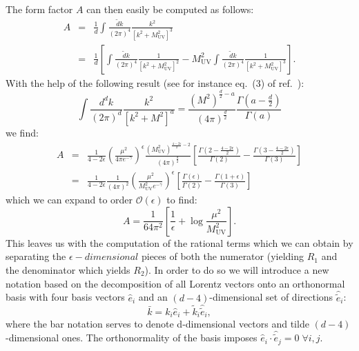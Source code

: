 \documentclass[11pt]{article}
\begin{document}
The form factor $A$ can then easily be computed as follows:
\begin{eqnarray}
A&=&\frac{1}{d} \int \frac{\tilde{d} k}{(2\pi)^4} \frac{ k^2 }{\left[ k^2+M_\textrm{UV}^2\right]^3} \nonumber\\
&=&\frac{1}{d} \left [ 
\int\frac{\tilde{d} k}{(2\pi)^4} \frac{ 1 }{\left[ k^2+M_\textrm{UV}^2\right]^2} 
-M_\textrm{UV}^2 \int \frac{\tilde{d} k}{(2\pi)^4} \frac{ 1 }{\left[ k^2+M_\textrm{UV}^2\right]^3} 
\right ].
\end{eqnarray}
With the help of the following result (see for instance eq.~(3) of ref.~\cite{Steinhauser:2000ry}):
\begin{equation}
\int \frac{d^d k}{(2\pi)^d} \frac{ k^2 }{\left[ k^2+M^2\right]^a} =\frac{(M^2)^{\frac{d}{2}-a}}{(4\pi)^\frac{d}{2}}\frac{\Gamma(a-\frac{d}{2})}{\Gamma(a)}
\end{equation}
we find:
\begin{eqnarray}
A&=&\frac{1}{4-2\epsilon}\left(\frac{\mu^2}{4\pi e^{-\gamma}}\right)^{\epsilon} \frac{(M_\textrm{UV}^2)^{\frac{4-2\epsilon}{2}-2}}{(4\pi)^\frac{d}{2}} \left [ 
\frac{\Gamma(2-\frac{4-2\epsilon}{2})}{\Gamma(2)} - \frac{\Gamma(3-\frac{4-2\epsilon}{2})}{\Gamma(3)}
\right] \nonumber \\
&=&\frac{1}{4-2\epsilon} \frac{1}{(4\pi)^2}\left(\frac{\mu^2}{M_\textrm{UV}^2 e^{-\gamma}}\right)^{\epsilon}\left [ 
\frac{\Gamma(\epsilon)}{\Gamma(2)} - \frac{\Gamma(1+\epsilon)}{\Gamma(3)}
\right] 
\end{eqnarray}
which we can expand to order $\mathcal{O}(\epsilon)$ to find:
\begin{equation}
A=\frac{1}{64\pi^2}\left[ \frac{1}{\epsilon} + \log{\frac{\mu^2}{M_\textrm{UV}^2}} \right].
\end{equation}
This leaves us with the computation of the rational terms which we can obtain by separating the $\epsilon-dimensional$ pieces of both the numerator (yielding $R_1$ and the denominator which yields $R_2$).
In order to do so we will introduce a new notation based on the decomposition of all Lorentz vectors onto an orthonormal basis with four basis vectors $\hat{e}_i$ and an $(d-4)$-dimensional set of directions $\hat{\tilde{e}}_i$:
\begin{equation}
\bar{k} = k_i \hat{e}_i + \tilde{k}_i \hat{\tilde{e}}_i,
\end{equation}
where the bar notation serves to denote d-dimensional vectors and tilde $(d-4)$-dimensional ones. 
The orthonormality of the basis imposes $\hat{e}_i \cdot \hat{\tilde{e}}_j = 0\; \forall i,j$.
\end{document}
